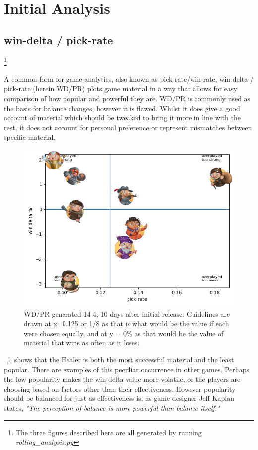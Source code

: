 \documentclass{tufte-handout}
\begin{document}
\section{Initial Analysis}

\subsection{win-delta / pick-rate}\footnote{The three figures described here are all generated by running \textit{rolling\_analysis.py}}

A common form for game analytics, also known as pick-rate/win-rate, win-delta / pick-rate (herein WD/PR) plots game material in a way that allows for easy comparison of how popular and powerful they are. WD/PR is commonly used as the basis for balance changes, however it is flawed. Whilst it does give a good account of material which should be tweaked to bring it more in line with the rest, it does not account for personal preference or represent mismatches between specific material. 

\begin{figure}
    \centering
    \includegraphics{pick-win.png}
    \caption{WD/PR generated 14-4, 10 days after initial release. Guidelines are drawn at x=0.125 or 1/8 as that is what would be the value if each were chosen equally, and at y = 0\% as that would be the value of material that wins as often as it loses.}
    \label{fig:WD/PR}
\end{figure}


~\cref{fig:WD/PR}~shows that the Healer is both the most successful material and the least popular. \href{'https://staticctf.akamaized.net/J3yJr34U2pZ2Ieem48Dwy9uqj5PNUQTn/2MXEODt9QteOU3WGh4vmNE/51261bebfc558521b7411ccb78ece4fb/Y5S1_Matrix_Attackers.png'}{There are examples of this peculiar occurrence in other games.} Perhaps the low popularity makes the win-delta value more volatile, or the players are choosing based on factors other than their effectiveness. However popularity should be balanced for just as effectiveness is, as game designer Jeff Kaplan states, \textit{"The perception of balance is more powerful than balance itself."}
\end{document}
